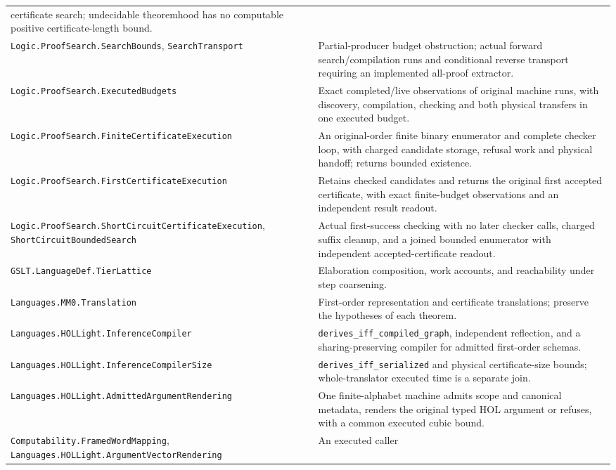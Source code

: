 \documentclass[11pt]{article}
\newcommand{\code}[1]{\nolinkurl{#1}}
\begin{document}
{\begin{longtable}{>{\raggedright\arraybackslash}p{.39\linewidth}>{\raggedright\arraybackslash}p{.55\linewidth}}
  certificate search; undecidable theoremhood has no computable positive
  certificate-length bound.\\
\code{Logic.ProofSearch.SearchBounds}, \code{SearchTransport} & Partial-producer
  budget obstruction; actual forward search/compilation runs and conditional
  reverse transport requiring an implemented all-proof extractor.\\
\code{Logic.ProofSearch.ExecutedBudgets} & Exact completed/live observations
  of original machine runs, with discovery, compilation, checking and both
  physical transfers in one executed budget.\\
\code{Logic.ProofSearch.FiniteCertificateExecution} & An original-order
  finite binary enumerator and complete checker loop, with charged candidate
  storage, refusal work and physical handoff; returns bounded existence.\\
\code{Logic.ProofSearch.FirstCertificateExecution} & Retains checked
  candidates and returns the original first accepted certificate, with
  exact finite-budget observations and an independent result readout.\\
\code{Logic.ProofSearch.ShortCircuitCertificateExecution},
\code{ShortCircuitBoundedSearch} & Actual first-success checking with no
  later checker calls, charged suffix cleanup, and a joined bounded
  enumerator with independent accepted-certificate readout.\\
\code{GSLT.LanguageDef.TierLattice} & Elaboration composition, work
  accounts, and reachability under step coarsening.\\
\code{Languages.MM0.Translation} & First-order representation and
  certificate translations; preserve the hypotheses of each theorem.\\
\code{Languages.HOLLight.InferenceCompiler} &
  \code{derives_iff_compiled_graph}, independent reflection, and a
  sharing-preserving compiler for admitted first-order schemas.\\
\code{Languages.HOLLight.InferenceCompilerSize} &
  \code{derives_iff_serialized} and physical certificate-size bounds;
  whole-translator executed time is a separate join.\\
\code{Languages.HOLLight.AdmittedArgumentRendering} & One finite-alphabet
  machine admits scope and canonical metadata, renders the original typed
  HOL argument or refuses, with a common executed cubic bound.\\
\code{Computability.FramedWordMapping},
\code{Languages.HOLLight.ArgumentVectorRendering} & An executed caller

\end{longtable}}
\end{document}
